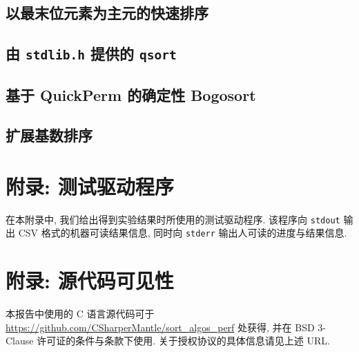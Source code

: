 \documentclass[12pt]{article}
\begin{document}


\subsection{以最末位元素为主元的快速排序}



\subsection{由 \texttt{stdlib.h} 提供的 \texttt{qsort}}



\subsection{基于 QuickPerm 的确定性 Bogosort}



\subsection{扩展基数排序}



\section{附录: 测试驱动程序}

在本附录中, 我们给出得到实验结果时所使用的测试驱动程序. 该程序向 \texttt{stdout} 输出 CSV 格式的机器可读结果信息, 同时向 \texttt{stderr} 输出人可读的进度与结果信息.



\section{附录: 源代码可见性}

本报告中使用的 C 语言源代码可于 \url{https://github.com/CSharperMantle/sort_algos_perf} 处获得, 并在 BSD 3-Clause 许可证的条件与条款下使用. 关于授权协议的具体信息请见上述 URL.
\end{document}
